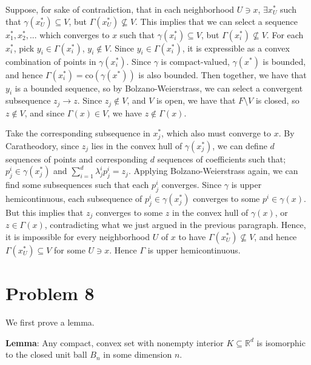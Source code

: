 \documentclass[10pt,letter]{article}
\begin{document}
Suppose, for sake of contradiction, that in each neighborhood $U \ni x$, $\exists x^*_U$ such that $\gamma(x^*_U) \subseteq V$, but $\Gamma(x^*_U) \not \subseteq V$. This implies that we can select a sequence $x^*_1, x^*_2, ...$ which converges to $x$ such that $\gamma(x^*_i) \subseteq V$, but $\Gamma(x^*_i) \not \subseteq V$. For each $x^*_i$, pick $y_i \in \Gamma(x^*_i)$, $y_i \not \in V$. Since $y_i \in \Gamma(x^*_i)$, it is expressible as a convex combination of points in $\gamma(x^*_i)$.
Since $\gamma$ is compact-valued, $\gamma(x^*)$ is bounded, and hence $\Gamma(x^*_i) = \text{co} (\gamma(x^*))$ is also bounded. Then together, we have that $y_i$ is a bounded sequence, so by Bolzano-Weierstrass, we can select a convergent subsequence $z_j \to z$. Since $z_j \not\in V$, and $V$ is open, we have that $F \setminus V$ is closed, so $z \not \in V$, and since $\Gamma(x) \in V$, we have $z \not \in \Gamma(x)$.

Take the corresponding subsequence in $x^*_j$, which also must converge to $x$. By Caratheodory, since $z_j$ lies in the convex hull of $\gamma(x^*_j)$, we can define $d$ sequences of points and corresponding $d$ sequences of coefficients such that; $p^i_j \in \gamma(x^*_j)$ and $\sum_{i = 1}^d \lambda^i_j p^i_j = z_j$. Applying Bolzano-Weierstrass again, we can find some subsequences such that each $p^i_j$ converges. Since $\gamma$ is upper hemicontinuous, each subsequence of $p^i_j \in \gamma(x^*_j)$ converges to some $p^i \in \gamma(x)$. But this implies that $z_j$ converges to some $z$ in the convex hull of $\gamma(x)$, or $z \in \Gamma(x)$, contradicting what we just argued in the previous paragraph. Hence, it is impossible for every neighborhood $U$ of $x$ to have $\Gamma(x^*_U) \not \subseteq V$, and hence $\Gamma(x^*_U) \subseteq V$ for some $U \ni x$. Hence $\Gamma$ is upper hemicontinuous.

\section*{Problem 8}
We first prove a lemma.

\textbf{Lemma}: Any compact, convex set with nonempty interior $K \subseteq \mathbb{R}^d$ is isomorphic to the closed unit ball $B_n$ in some dimension $n$.
\end{document}
